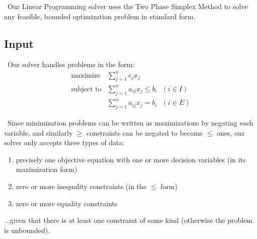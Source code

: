 \documentclass[11pt]{article}
\begin{document}
~\indent Our Linear Programming solver uses the Two Phase 
Simplex Method to solve any feasible, bounded optimization problem in standard form.
    \subsection{Input}
~\indent Our solver handles problems in the form:~\cite{chvatal83}
\begin{eqnarray*}
\mbox{maximize}& \sum\limits_{j=1}^n c_jx_j\\
\mbox{subject to}& \sum\limits_{j=1}^n a_{ij}x_j \leq b_i\mbox{\ \ }(i \in I)\\
& \sum\limits_{j=1}^n a_{ij}x_j = b_i\mbox{\ \ }(i \in E)
\end{eqnarray*}

~\indent Since minimization problems can be written as maximizations by negating each variable, and similarly $\geq$ constraints can be negated to become $\leq$ ones, our solver only accepts three types of data:
\begin{enumerate}
\item precisely one objective equation with one or more decision variables (in its maximization form)
\item zero or more inequality constraints (in the $\leq$ form)
\item zero or more equality constraints
\end{enumerate}
...given that there is at least one constraint of some kind (otherwise the problem is unbounded).\\
\end{document}
